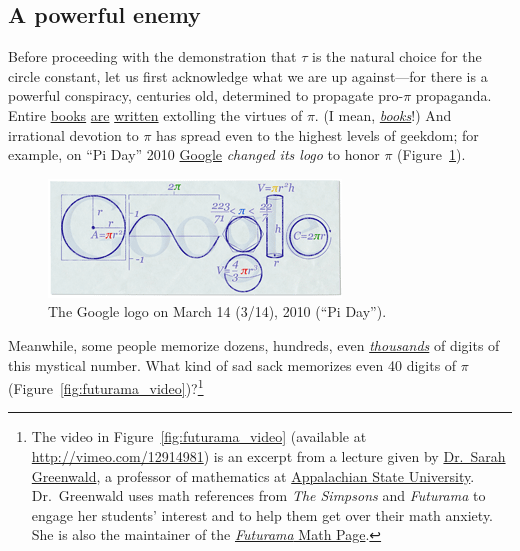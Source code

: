 \subsection{A powerful enemy} %
 \label{sec:a_powerful_enemy}

Before proceeding with the demonstration that $\tau$ is the natural choice for the circle constant, let us first acknowledge what we are up against---for there is a powerful conspiracy, centuries old, determined to propagate pro-$\pi$ propaganda. Entire \href{http://www.amazon.com/exec/obidos/ISBN=0802713327/parallaxproductiA/}{books} \href{http://www.amazon.com/Pi-Sky-Counting-Thinking-Being/dp/0198539568}{are} \href{http://www.amazon.com/exec/obidos/ISBN=0312381859/parallaxproductiA/}{written} extolling the virtues of $\pi$. (I mean, \href{http://www.amazon.com/exec/obidos/ISBN=0387989463/parallaxproductiA/}{\emph{books}}!) And irrational devotion to $\pi$ has spread even to the highest levels of geekdom; for example, on ``Pi Day'' 2010 \href{http://www.google.com/}{Google} \emph{changed its logo} to honor $\pi$  (Figure~\ref{fig:google_pi_day.}).

\begin{figure}
\begin{center}
\includegraphics{images/figures/google-pi-day.png}
\end{center}
\caption{The Google logo on March 14 (3/14), 2010 (``Pi Day'').\label{fig:google_pi_day.}}
\end{figure}

Meanwhile, some people memorize dozens, hundreds, even \href{http://en.wikipedia.org/wiki/Lu_Chao}{\emph{thousands}} of digits of this mystical number. What kind of sad sack memorizes even 40 digits of $\pi$ (Figure~\ref{fig:futurama_video})?\footnote{The video in Figure~\ref{fig:futurama_video} (available at  \href{http://vimeo.com/12914981}{http://vimeo.com/12914981}) is an excerpt from a lecture given by \href{http://mathsci.appstate.edu/~sjg/}{Dr.\ Sarah Greenwald}, a professor of mathematics at \href{http://www.appstate.edu/}{Appalachian State University}. Dr.\ Greenwald uses math references from \emph{The Simpsons} and \emph{Futurama} to engage her students' interest and to help them get over their math anxiety. She is also the maintainer of the \href{http://mathsci2.appstate.edu/~sjg/futurama/}{\emph{Futurama} Math Page}.}

